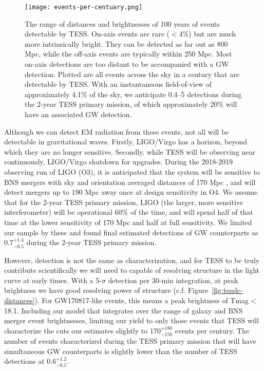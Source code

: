 \documentclass[modern]{aastex61}
\begin{document}


\begin{figure}
\centering
\texttt{[image: events-per-centuary.png]}
\caption{The range of distances and brightnesses of 100 years of events detectable by TESS. On-axis events are rare ($<$4\%) but are much more intrinsically bright. They can be detected as far out as 800 Mpc, while the off-axis events are typically within 250 Mpc. Most on-axis detections are too distant to be accompanied with a GW detection. Plotted are all events across the sky in a century that are detectable by TESS. With an instantaneous field-of-view of approximately 4.1\% of the sky, we anticipate 0.4--5 detections during the 2-year TESS primary mission, of which approximately 20\% will have an associated GW detection.}
\label{fig:event-distances}
\end{figure}

Although we can detect EM radiation from these events, not all will be detectable in gravitational waves. Firstly, LIGO/Virgo has a horizon, beyond which they are no longer sensitive. Secondly, while TESS will be observing near continuously, LIGO/Virgo shutdown for upgrades. During the 2018-2019 observing run of LIGO (O3), it is anticipated that the system will be sensitive to BNS mergers with sky and orientation averaged distances of 170 Mpc \citep{Abbott2016}, and will detect mergers up to 190 Mpc away once at design sensitivity in O4. We assume that for the 2-year TESS primary mission, LIGO (the larger, more sensitive interferometer) will be operational 60\% of the time, and will spend half of that time at the lower sensitivity of 170 Mpc and half at full sensitivity. We limited our sample by these and found final estimated detections of GW counterparts as $0.7^{+1.4}_{-0.5}$ during the 2-year TESS primary mission.

However, detection is not the same as characterization, and for TESS to be truly contribute scientifically we will need to capable of resolving structure in the light curve at early times. With a 5-$\sigma$ detection per 30-min integration, at peak brightness we have good resolving power of structure (c.f. Figure~\ref{fig:tesslc-distances}). For GW170817-like events, this means a peak brightness of Tmag$<$18.1. Including our model that integrates over the range of galaxy and BNS merger event brightnesses, limiting our yield to only those events that TESS will characterize the cuts our estimates slightly to 170$^{+180}_{-150}$ events per century. The number of events characterized during the TESS primary mission that will have simultaneous GW counterparts is slightly lower than the number of TESS detections at $0.6^{+1.2}_{-0.5}$.
\end{document}
